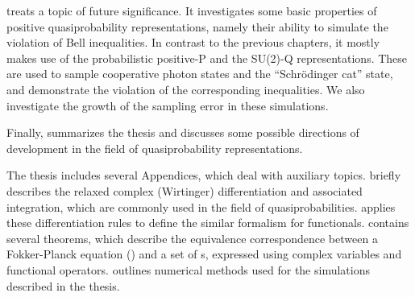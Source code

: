 treats a topic of future significance.
It investigates some basic properties of positive quasiprobability representations, namely their ability to simulate the violation of Bell inequalities.
In contrast to the previous chapters, it mostly makes use of the probabilistic positive-P and the SU(2)-Q representations.
These are used to sample cooperative photon states and the ``Schr\"odinger cat'' state, and demonstrate the violation of the corresponding inequalities.
We also investigate the growth of the sampling error in these simulations.

Finally,  summarizes the thesis and discusses some possible directions of development in the field of quasiprobability representations.

The thesis includes several Appendices, which deal with auxiliary topics.
 briefly describes the relaxed complex (Wirtinger) differentiation and associated integration, which are commonly used in the field of quasiprobabilities.
 applies these differentiation rules to define the similar formalism for functionals.
 contains several theorems, which describe the equivalence correspondence between a Fokker-Planck equation () and a set of s, expressed using complex variables and functional operators.
 outlines numerical methods used for the simulations described in the thesis.
